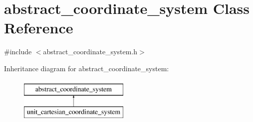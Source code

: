 \hypertarget{classabstract__coordinate__system}{\section{abstract\-\_\-coordinate\-\_\-system Class Reference}
\label{classabstract__coordinate__system}
}


{\ttfamily \#include $<$abstract\-\_\-coordinate\-\_\-system.\-h$>$}

Inheritance diagram for abstract\-\_\-coordinate\-\_\-system\-:\begin{figure}[H]
\begin{center}
\leavevmode
\includegraphics[height=2.000000cm]{classabstract__coordinate__system}
\end{center}
\end{figure}
